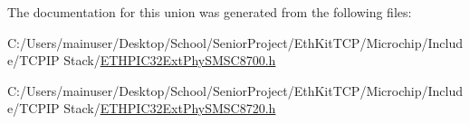 The documentation for this union was generated from the following files\+:\begin{DoxyCompactItemize}
\item 
C\+:/\+Users/mainuser/\+Desktop/\+School/\+Senior\+Project/\+Eth\+Kit\+T\+C\+P/\+Microchip/\+Include/\+T\+C\+P\+I\+P Stack/\hyperlink{_e_t_h_p_i_c32_ext_phy_s_m_s_c8700_8h}{E\+T\+H\+P\+I\+C32\+Ext\+Phy\+S\+M\+S\+C8700.\+h}\item 
C\+:/\+Users/mainuser/\+Desktop/\+School/\+Senior\+Project/\+Eth\+Kit\+T\+C\+P/\+Microchip/\+Include/\+T\+C\+P\+I\+P Stack/\hyperlink{_e_t_h_p_i_c32_ext_phy_s_m_s_c8720_8h}{E\+T\+H\+P\+I\+C32\+Ext\+Phy\+S\+M\+S\+C8720.\+h}\end{DoxyCompactItemize}
